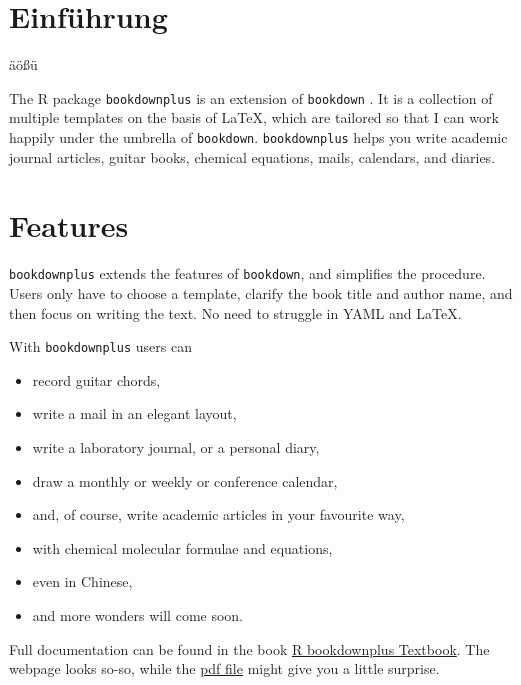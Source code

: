 \hypertarget{einfuhrung}{%
\chapter{Einführung}\label{einfuhrung}}

äößü

The R package \texttt{bookdownplus} \autocite{R-bookdownplus} is an extension of \texttt{bookdown} \autocite{R-bookdown}. It is a collection of
multiple templates on the basis of LaTeX, which are tailored so that I can work happily under the umbrella of \texttt{bookdown}. \texttt{bookdownplus} helps you write academic journal articles, guitar books, chemical equations, mails, calendars, and diaries.


\hypertarget{features}{%
\chapter{Features}\label{features}}

\texttt{bookdownplus} extends the features of \texttt{bookdown}, and simplifies the procedure. Users only have to choose a template, clarify the book title and author name, and then focus on writing the text. No need to struggle in YAML and LaTeX.

With \texttt{bookdownplus} users can

\begin{itemize}
\item
  record guitar chords,
\item
  write a mail in an elegant layout,
\item
  write a laboratory journal, or a personal diary,
\item
  draw a monthly or weekly or conference calendar,
\item
  and, of course, write academic articles in your favourite way,
\item
  with chemical molecular formulae and equations,
\item
  even in Chinese,
\item
  and more wonders will come soon.
\end{itemize}

Full documentation can be found in the book \href{https://bookdown.org/baydap/bookdownplus}{R bookdownplus Textbook}. The webpage looks so-so, while the \href{https://bookdown.org/baydap/bookdownplus/bookdownplus.pdf}{pdf file} might give you a little surprise.

